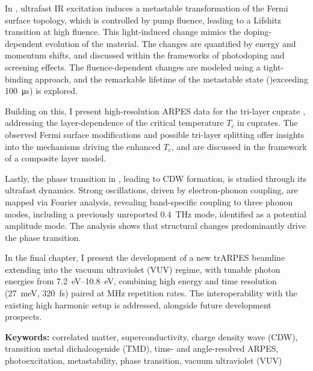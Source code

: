 In , ultrafast IR excitation induces a metastable transformation of the Fermi surface topology, which is controlled by pump fluence, leading to a Lifshitz transition at high fluence.
This light-induced change mimics the doping-dependent evolution of the material.
The changes are quantified by energy and momentum shifts, and discussed within the frameworks of photodoping and screening effects.
The fluence-dependent changes are modeled using a tight-binding approach, and the remarkable lifetime of the metastable state ()exceeding \qty{100}{\micro\second}) is explored.

Building on this, I present high-resolution ARPES data for the tri-layer cuprate , addressing the layer-dependence of the critical temperature $T_c$ in cuprates.
The observed Fermi surface modifications and possible tri-layer splitting offer insights into the mechanisms driving the enhanced $T_c$, and are discussed in the framework of a composite layer model.

Lastly, the phase transition in , leading to CDW formation, is studied through its ultrafast dynamics.
Strong oscillations, driven by electron-phonon coupling, are mapped via Fourier analysis, revealing band-specific coupling to three phonon modes, including a previously unreported \qty{0.4}{\tera\hertz} mode, identified as a potential amplitude mode.
The analysis shows that structural changes predominantly drive the phase transition.

In the final chapter, I present the development of a new trARPES beamline extending into the vacuum ultraviolet (VUV) regime, with tunable photon energies from \qtyrange{7.2}{10.8}{\electronvolt}, combining high energy and time resolution (\qty{27}{\milli\electronvolt}, \qty{320}{\femto\second}) paired at \unit{\mega\hertz} repetition rates.
The interoperability with the existing high harmonic setup is addressed, alongside future development prospects.\hfill\break

\textbf{Keywords:} correlated matter, superconductivity, charge density wave (CDW), transition metal dichalcogenide (TMD), time- and angle-resolved ARPES, photoexcitation, metastability, phase transition, vacuum ultraviolet (VUV)


